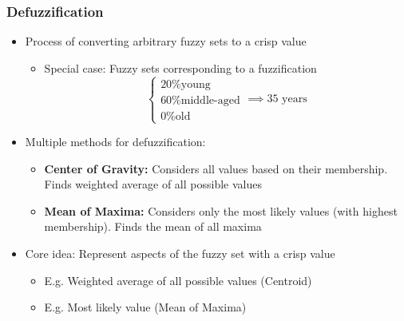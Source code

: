 \documentclass[
	10pt,
	t		%
]{beamer}
\begin{document}
\begin{frame}
	\frametitle{Defuzzification}
	\begin{itemize}
		\item Process of converting arbitrary fuzzy sets to a crisp value
		      \begin{itemize}
			      \item Special case: Fuzzy sets corresponding to a fuzzification
			            \[  \begin{cases}
					            \text{20\% young}       \\
					            \text{60\% middle-aged} \\
					            \text{0\% old}
				            \end{cases} \implies \text{35 years}
			            \]
		      \end{itemize}
		\item Multiple methods for defuzzification:
		      \begin{itemize}
			      \item \textbf{Center of Gravity:} Considers all values based on their membership. Finds weighted average of all possible values
			      \item \textbf{Mean of Maxima:} Considers only the most likely values (with highest membership). Finds the mean of all maxima
		      \end{itemize}
		\item Core idea: Represent aspects of the fuzzy set with a crisp value
		      \begin{itemize}
			      \item E.g. Weighted average of all possible values (Centroid)
			      \item E.g. Most likely value (Mean of Maxima)
		      \end{itemize}
	\end{itemize}

\end{frame}
\end{document}
